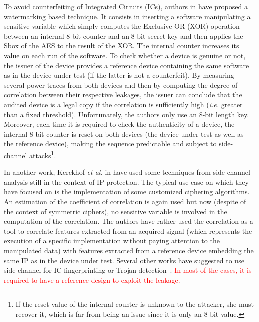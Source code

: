 \documentclass{llncs}
\newcommand\del[1]{\textcolor{red}{#1}}
\begin{document}
To avoid counterfeiting of Integrated Circuits (ICs), authors in \cite{DBLP:conf/socc/MarchandBJ14} have proposed a watermarking based technique. It consists in inserting a software manipulating a sensitive variable which simply computes the Exclusive-OR (XOR) operation between an internal $8$-bit counter and an $8$-bit secret key and then applies the Sbox of the AES to the result of the XOR. The internal counter increases its value on each run of the software. 
To check whether a device is genuine or not, the issuer of the device provides a reference device containing the same software as in the device under test (if the latter is not a counterfeit). By measuring several power traces from both devices and then by computing the degree of correlation between their respective leakages, the issuer can conclude that the audited device is a legal copy if the correlation is sufficiently high (\emph{i.e.} greater than a fixed threshold). 
Unfortunately, the authors only use an $8$-bit length key. Moreover, each time it is required to check the authenticity of a device, the internal $8$-bit counter is reset on both devices (the device under test as well as the reference device), making the sequence predictable and subject to side-channel attacks\footnote{If the reset value of the internal counter is unknown to the attacker, she must recover it, which is far from being an issue since it is only an $8$-bit value.}. 

In another work, Kerckhof \emph{et al.} in \cite{DBLP:conf/host/KerckhofDSG13} have used some techniques from side-channel analysis still in the context of IP protection. 
The typical use case on which they have focused on is the implementation of some customized ciphering algorithms. 
An estimation of the coefficient of correlation is again used but now (despite of the context of symmetric ciphers), no sensitive variable is involved in the computation of the correlation. 
The authors have rather used the correlation as a tool to correlate features extracted from an acquired signal (which represents the execution of a specific implementation without paying attention to the manipulated data) with features extracted from a reference device embedding the same IP as in the device under test. 
Several other works have suggested to use side channel for IC fingerprinting or Trojan detection~\cite{7256167,10.1007/978-3-642-15031-9_12}. \del{In most of the cases, it is required to have a reference design to exploit the leakage.}
\end{document}
